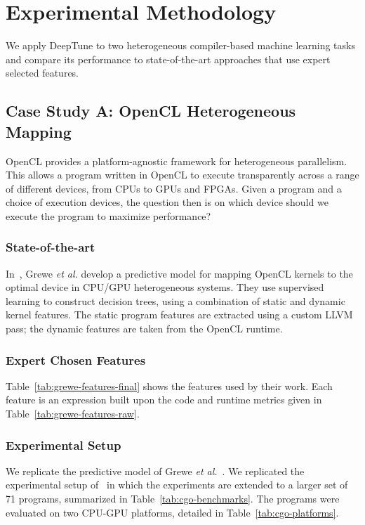 \section{Experimental Methodology}\label{sec:methodology}

We apply DeepTune to two heterogeneous compiler-based machine learning tasks and compare its performance to state-of-the-art approaches that use expert selected features.


\subsection{Case Study A: OpenCL Heterogeneous Mapping} \label{subsec:case-study-a}



OpenCL provides a platform-agnostic framework for heterogeneous parallelism. This allows a program written in OpenCL to execute transparently across a range of different devices, from CPUs to GPUs and FPGAs. Given a program and a choice of execution devices, the question then is on which device should we execute the program to maximize performance?

\subsubsection{State-of-the-art} In~\cite{Grewe2013}, Grewe \emph{et al.} develop a predictive model for mapping OpenCL kernels to the optimal device in CPU/GPU heterogeneous systems. They use supervised learning to construct decision trees, using a combination of static and dynamic kernel features. The static program features are extracted using a custom LLVM pass; the dynamic features are taken from the OpenCL runtime.

\subsubsection{Expert Chosen Features} Table~\ref{tab:grewe-features-final} shows the features used by their work. Each feature is an expression built upon the code and runtime metrics given in Table~\ref{tab:grewe-features-raw}.

\subsubsection{Experimental Setup} We replicate the predictive model of Grewe \emph{et al.}~\cite{Grewe2013}. We replicated the experimental setup of~\cite{Cummins2017a} in which the experiments are extended to a larger set of 71 programs, summarized in Table~\ref{tab:cgo-benchmarks}. The programs were evaluated on two CPU-GPU platforms, detailed in Table~\ref{tab:cgo-platforms}.


